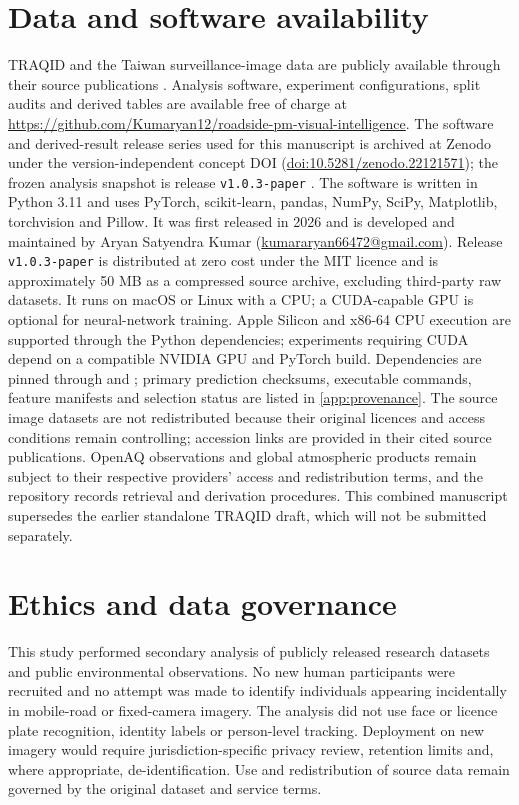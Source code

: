 \documentclass[review,12pt,authoryear]{elsarticle}
\begin{document}
\section*{Data and software availability}

TRAQID and the Taiwan surveillance-image data are publicly available through
their source publications \citep{kathalkar2024traqid,wang2026unified}.
Analysis software, experiment configurations, split audits and derived tables
are available free of charge at
\url{https://github.com/Kumaryan12/roadside-pm-visual-intelligence}.
The software and derived-result release series used for this manuscript is
archived at Zenodo under the version-independent concept DOI
(\href{https://doi.org/10.5281/zenodo.22121571}{doi:10.5281/zenodo.22121571});
the frozen analysis snapshot is release \texttt{v1.0.3-paper}
\citep{kumar2026roadside}. The software is written in
Python 3.11 and uses PyTorch, scikit-learn, pandas, NumPy, SciPy, Matplotlib,
torchvision and Pillow. It was first released in 2026 and is developed and
maintained by Aryan Satyendra Kumar
(\href{mailto:kumararyan66472@gmail.com}{kumararyan66472@gmail.com}). Release
\texttt{v1.0.3-paper} is distributed at zero cost under the MIT licence and is
approximately 50 MB as a compressed source archive, excluding third-party raw
datasets. It runs on macOS or Linux with a CPU; a CUDA-capable GPU is optional
for neural-network training. Apple Silicon and x86-64 CPU execution are
supported through the Python dependencies; experiments requiring CUDA depend
on a compatible NVIDIA GPU and PyTorch build.
Dependencies are pinned through  and
; primary prediction checksums, executable commands,
feature manifests and selection status are listed in \ref{app:provenance}.
The source image datasets are not redistributed because their original licences
and access conditions remain controlling; accession links are provided in their
cited source publications. OpenAQ observations and global atmospheric products
remain subject to their respective providers' access and redistribution terms,
and the repository records retrieval and derivation procedures. This combined
manuscript supersedes
the earlier standalone TRAQID draft, which will not be submitted separately.

\section*{Ethics and data governance}
This study performed secondary analysis of publicly released research
datasets and public environmental observations. No new human participants were
recruited and no attempt was made to identify individuals appearing incidentally
in mobile-road or fixed-camera imagery. The analysis did not use face or licence
plate recognition, identity labels or person-level tracking. Deployment on new
imagery would require jurisdiction-specific privacy review, retention limits
and, where appropriate, de-identification. Use and redistribution of source
data remain governed by the original dataset and service terms.
\end{document}
